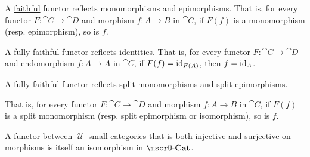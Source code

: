 \begin{proposition}
\begin{thmenum}
     A \hyperref[def:functor_invertibility/faithful]{faithful} functor reflects monomorphisms and epimorphisms. That is, for every functor \( F: \cat{C} \to \cat{D} \) and morphism \( f: A \to B \) in \( \cat{C} \), if \( F(f) \) is a monomorphism (resp. epimorphism), so is \( f \).

     A \hyperref[def:functor_invertibility/fully_faithful]{fully faithful} functor reflects identities. That is, for every functor \( F: \cat{C} \to \cat{D} \) and endomorphism \( f: A \to A \) in \( \cat{C} \), if \( F(f) = \operatorname{id}_{F(A)} \), then \( f = \operatorname{id}_A \).

     A \hyperref[def:functor_invertibility/fully_faithful]{fully faithful} functor reflects split monomorphisms and split epimorphisms.

    That is, for every functor \( F: \cat{C} \to \cat{D} \) and morphism \( f: A \to B \) in \( \cat{C} \), if \( F(f) \) is a split monomorphism (resp. split epimorphism or isomorphism), so is \( f \).

     A functor between \( \mscrU \)-small categories that is both injective and surjective on morphisms is itself an isomorphism in \( \ucat{Cat} \).
  \end{thmenum}
\end{proposition}
